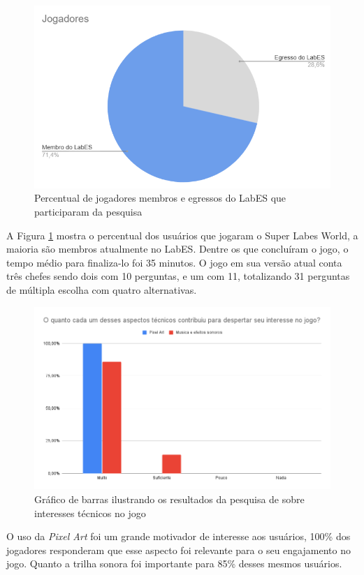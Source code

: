 \begin{figure}[h!]
    \centering
    \includegraphics[width=0.8\linewidth]{figuras/players-pizza.png}
    \caption{Percentual de jogadores membros e egressos do LabES que participaram da pesquisa}
    \label{fig:players-pizza}
\end{figure}

A Figura \ref{fig:players-pizza} mostra o percentual dos usuários que jogaram o Super Labes World, a maioria são membros atualmente no LabES. Dentre os que concluíram o jogo, o tempo médio para finaliza-lo foi 35 minutos. O jogo em sua versão atual conta três chefes sendo dois com 10 perguntas, e um com 11, totalizando 31 perguntas de múltipla escolha com quatro alternativas. 

\begin{figure}[h!]
    \centering
    \includegraphics[width=1\linewidth]{figuras/graph-2.png}
    \caption{Gráfico de barras ilustrando os resultados da pesquisa de sobre interesses técnicos no jogo}
    \label{fig:graph-2}
\end{figure}
\clearpage
O uso da \textit{Pixel Art} foi um grande motivador de interesse aos usuários, 100\% dos jogadores responderam que esse aspecto foi relevante para o seu engajamento no jogo. Quanto a trilha sonora foi importante para 85\% desses mesmos usuários.


